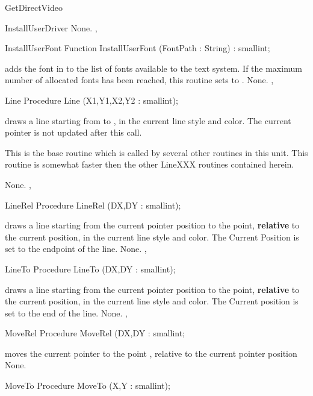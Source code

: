 \begin{function}{GetDirectVideo}
\begin{function}{InstallUserDriver}
\Errors
None.
\SeeAlso
{}, 
\end{function}
\begin{function}{InstallUserFont}
\Declaration
Function InstallUserFont (FontPath : String) : smallint;

\Description
{} adds the font in  to the list of fonts
available to the text system. If the maximum number of allocated fonts has
been reached, this routine sets  to .
\Errors
None.
\SeeAlso
{}, 
\end{function}
\begin{procedure}{Line}
\Declaration
Procedure Line (X1,Y1,X2,Y2 : smallint);

\Description
{} draws a line starting from
 to , in the current line style and color.
The current pointer is not updated after this call.

This is the base routine which is called by several other routines
in this unit. This routine is somewhat faster then the other
LineXXX routines contained herein.


\Errors
None.
\SeeAlso
{},
\end{procedure}
\begin{procedure}{LineRel}
\Declaration
Procedure LineRel (DX,DY : smallint);

\Description
{} draws a line starting from
the current pointer position to the point, \textbf{relative} to the
current position, in the current line style and color. The Current Position
is set to the endpoint of the line.
\Errors
None.
\SeeAlso
{}, 
\end{procedure}
\begin{procedure}{LineTo}
\Declaration
Procedure LineTo (DX,DY : smallint);

\Description
{} draws a line starting from
the current pointer position to the point, \textbf{relative} to the
current position, in the current line style and color. The Current position
is set to the end of the line.
\Errors
None.
\SeeAlso
{},
\end{procedure}
\begin{procedure}{MoveRel}
\Declaration
Procedure MoveRel (DX,DY : smallint;

\Description
{} moves the current pointer to the
point , relative to the current pointer
position
\Errors
None.
\SeeAlso
{}
\end{procedure}
\begin{procedure}{MoveTo}
\Declaration
Procedure MoveTo (X,Y : smallint);


\end{procedure}
\end{function}
